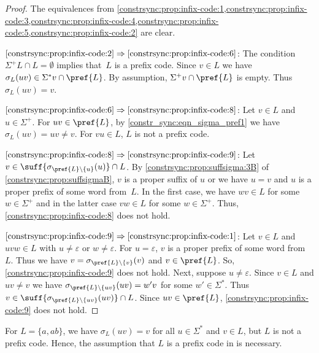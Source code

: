 \begin{proof}
The equivalences from \cref{constrsync:prop:infix-code:1,constrsync:prop:infix-code:3,constrsync:prop:infix-code:4,constrsync:prop:infix-code:5,constrsync:prop:infix-code:2} are clear.
	
$\ref{constrsync:prop:infix-code:2}\Rightarrow \ref{constrsync:prop:infix-code:6}$:
The condition $\Sigma^+L \cap L = \emptyset$ implies that~$L$ is a prefix code.
Since $v \in L$ we have $\sigma_L(uv) \in \Sigma^*v \cap \pref{L}$.
By assumption, $\Sigma^+ v \cap \pref{L}$ is empty. Thus $\sigma_L(uv) = v$.

$\ref{constrsync:prop:infix-code:6}\Rightarrow \ref{constrsync:prop:infix-code:8}$:
Let $v \in L$ and $u \in \Sigma^+$.
For $uv \in \pref{L}$, by \cref{constr_sync:eqn_sigma_pref1} we have $\sigma_L(uv) = uv \ne v$.
For $vu \in L$, $L$ is not a prefix code.

$\ref{constrsync:prop:infix-code:8}\Rightarrow \ref{constrsync:prop:infix-code:9}$:
Let $v \in \suff{\sigma_{\pref{L}\setminus\{u\}}(u)} \cap L$.
By \cref{constrsync:prop:suffsigma:3B} of \cref{constrsync:prop:suffsigmaB}, 
$v$ is a proper suffix of $u$ or we have $u = v$ and $u$ is a proper prefix of some word from~$L$.
In the first case, we have $wv \in L$ for some $w \in \Sigma^+$
and in the latter case $vw \in L$ for some $w \in \Sigma^+$.
Thus, \cref{constrsync:prop:infix-code:8} does not hold.

$\ref{constrsync:prop:infix-code:9}\Rightarrow \ref{constrsync:prop:infix-code:1}$:
Let $v \in L$ and $uvw \in L$ with $u \ne \varepsilon$ or $w \ne \varepsilon$.
For $u = \varepsilon$, $v$ is a proper prefix of some word from~$L$.
Thus we have $v = \sigma_{\pref{L}\setminus\{v\}}(v)$ and $v \in \pref{L}$.
So,  \cref{constrsync:prop:infix-code:9}
does not hold.
Next, suppose $u \ne \varepsilon$.
Since $v \in L$ and $uv\ne v$
we have $\sigma_{\pref{L}\setminus\{uv\}}(uv) = w'v$ for some $w' \in \Sigma^*$.
Thus $v \in \suff{\sigma_{\pref{L}\setminus\{uv\}}(uv)} \cap L$.
Since $uv \in \pref{L}$, \cref{constrsync:prop:infix-code:9}
does not hold.
\end{proof}

\begin{example} 	
	For $L = \{a,ab\}$, we have $\sigma_L(uv) = v$ for all $u \in \Sigma^*$ and $v \in L$, but $L$ is not a prefix code. Hence, the assumption that $L$ is a prefix code in  is necessary.
\end{example}

